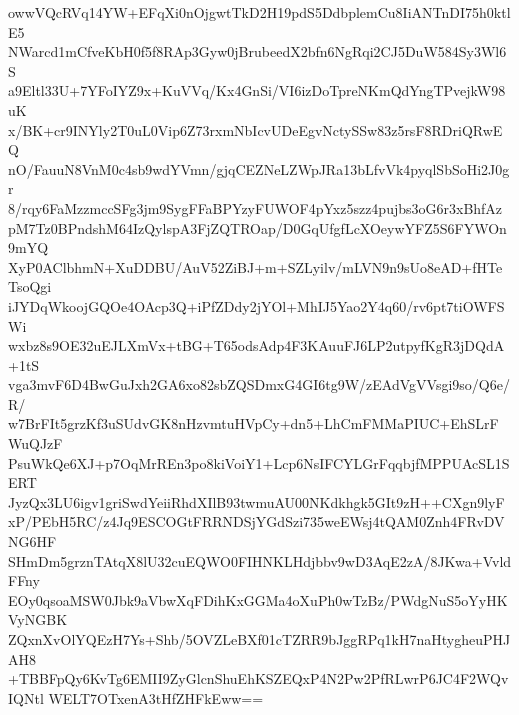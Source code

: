 owwVQcRVq14YW+EFqXi0nOjgwtTkD2H19pdS5DdbplemCu8IiANTnDI75h0ktlE5
NWarcd1mCfveKbH0f5f8RAp3Gyw0jBrubeedX2bfn6NgRqi2CJ5DuW584Sy3Wl6S
a9Eltl33U+7YFoIYZ9x+KuVVq/Kx4GnSi/VI6izDoTpreNKmQdYngTPvejkW98uK
x/BK+cr9INYly2T0uL0Vip6Z73rxmNbIcvUDeEgvNctySSw83z5rsF8RDriQRwEQ
nO/FauuN8VnM0c4sb9wdYVmn/gjqCEZNeLZWpJRa13bLfvVk4pyqlSbSoHi2J0gr
8/rqy6FaMzzmccSFg3jm9SygFFaBPYzyFUWOF4pYxz5szz4pujbs3oG6r3xBhfAz
pM7Tz0BPndshM64IzQylspA3FjZQTROap/D0GqUfgfLcXOeywYFZ5S6FYWOn9mYQ
XyP0AClbhmN+XuDDBU/AuV52ZiBJ+m+SZLyilv/mLVN9n9sUo8eAD+fHTeTsoQgi
iJYDqWkoojGQOe4OAcp3Q+iPfZDdy2jYOl+MhIJ5Yao2Y4q60/rv6pt7tiOWFSWi
wxbz8s9OE32uEJLXmVx+tBG+T65odsAdp4F3KAuuFJ6LP2utpyfKgR3jDQdA+1tS
vga3mvF6D4BwGuJxh2GA6xo82sbZQSDmxG4GI6tg9W/zEAdVgVVsgi9so/Q6e/R/
w7BrFIt5grzKf3uSUdvGK8nHzvmtuHVpCy+dn5+LhCmFMMaPIUC+EhSLrFWuQJzF
PsuWkQe6XJ+p7OqMrREn3po8kiVoiY1+Lcp6NsIFCYLGrFqqbjfMPPUAcSL1SERT
JyzQx3LU6igv1griSwdYeiiRhdXIlB93twmuAU00NKdkhgk5GIt9zH++CXgn9lyF
xP/PEbH5RC/z4Jq9ESCOGtFRRNDSjYGdSzi735weEWsj4tQAM0Znh4FRvDVNG6HF
SHmDm5grznTAtqX8lU32cuEQWO0FIHNKLHdjbbv9wD3AqE2zA/8JKwa+VvldFFny
EOy0qsoaMSW0Jbk9aVbwXqFDihKxGGMa4oXuPh0wTzBz/PWdgNuS5oYyHKVyNGBK
ZQxnXvOlYQEzH7Ys+Shb/5OVZLeBXf01cTZRR9bJggRPq1kH7naHtygheuPHJAH8
+TBBFpQy6KvTg6EMII9ZyGlcnShuEhKSZEQxP4N2Pw2PfRLwrP6JC4F2WQvIQNtl
WELT7OTxenA3tHfZHFkEww==
